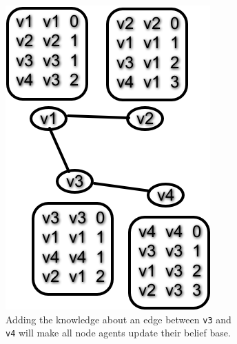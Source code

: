\begin{figure}
  \centering
    \ContinuedFloat %
    \begin{subfigure}{.45\textwidth}
        \includegraphics[width=\textwidth] {images/dv4.png}
        \caption{Adding the knowledge about an edge between \texttt{v3} and \texttt{v4} will make all node agents update their belief base.}
    \end{subfigure}\quad
    \begin{subfigure}{.45\textwidth}

\end{subfigure}
\end{figure}
